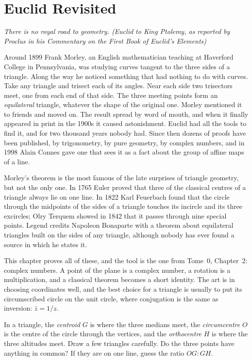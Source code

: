 \chapter{Euclid Revisited}\label{ch:euclid}

\begin{center}\itshape
There is no royal road to geometry.
\upshape(Euclid to King Ptolemy, as reported by Proclus in his \emph{Commentary on the First Book of Euclid's Elements})
\end{center}

Around 1899 Frank Morley, an English mathematician teaching at Haverford College in Pennsylvania, was studying curves
tangent to the three sides of a triangle. Along the way he noticed something that had nothing to do with curves. Take any
triangle and trisect each of its angles. Near each side two trisectors meet, one from each end of that side. The three
meeting points form an \emph{equilateral} triangle, whatever the shape of the original one. Morley mentioned it to friends
and moved on. The result spread by word of mouth, and when it finally appeared in print in the 1900s it caused
astonishment. Euclid had all the tools to find it, and for two thousand years nobody had. Since then dozens of proofs
have been published, by trigonometry, by pure geometry, by complex numbers, and in 1998 Alain Connes gave one that sees it
as a fact about the group of affine maps of a line.

Morley's theorem is the most famous of the late surprises of triangle geometry, but not the only one. In 1765 Euler proved that
three of the classical centres of a triangle always lie on one line. In 1822 Karl Feuerbach found that the circle through the midpoints of the sides
of a triangle touches its incircle and its three excircles; Olry Terquem showed in 1842 that it passes through nine special points. Legend credits Napoleon Bonaparte with a theorem about
equilateral triangles built on the sides of any triangle, although nobody has ever found a source in which he states it.

This chapter proves all of these, and the tool is the one from Tome~0, Chapter~2: complex numbers. A point of the plane is a
complex number, a rotation is a multiplication, and a classical theorem becomes a short identity. The art is in choosing
coordinates well, and the best choice for a triangle is usually to put its circumscribed circle on the unit circle, where
conjugation is the same as inversion: $\bar z=1/z$.

\begin{think}
In a triangle, the \emph{centroid} $G$ is where the three medians meet, the \emph{circumcentre} $O$ is the centre of the circle
through the vertices, and the \emph{orthocentre} $H$ is where the three altitudes meet. Draw a few triangles carefully. Do the
three points have anything in common? If they are on one line, guess the ratio $OG:GH$.
\end{think}

